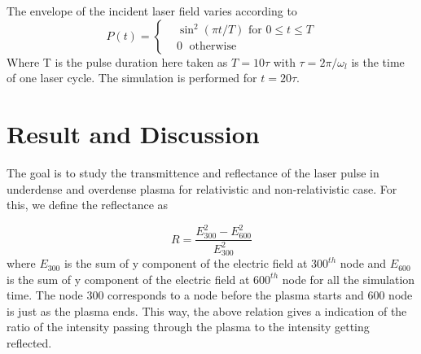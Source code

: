\documentclass[]{article}
\begin{document}
The envelope of the incident laser field varies according to \cite{lichters}
\begin{equation}\label{envelope}
    P(t)=
    \begin{cases}
         & \sin^2(\pi t/T) \text{ for } 0 \leq t \le T \\
         & 0         \;      \text{ otherwise }
    \end{cases}
\end{equation}
Where T is the pulse duration here taken as $T=10\tau$ with $\tau = 2\pi/\omega_l$ is the time of one laser cycle. The simulation is performed for $t=20\tau$.
\section{Result and Discussion}
The goal is to study the transmittence and reflectance of the laser pulse in underdense and overdense plasma for relativistic and non-relativistic case. For this, we define the reflectance as

\begin{equation}\label{reflectance}
    R
    = \frac{{E_{300}^2}-{E_{600}^2}}{{E_{300}^2}}
\end{equation}
where $E_{300}$ is the sum of y component of the electric field at $300^{th}$ node and $E_{600}$ is the sum of y component of the electric field at $600^{th}$ node for all the simulation time. The node 300 corresponds to a node before the plasma starts and 600 node is just as the plasma ends. This way, the above relation gives a indication of the ratio of the intensity passing through the plasma to the intensity getting reflected.
\end{document}
